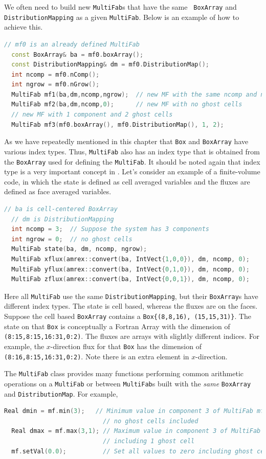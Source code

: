 {{We often need to build new {\tt MultiFab}s that have the same {\tt
  BoxArray} and {\tt DistributionMapping} as a given {\tt MultiFab}.
Below is an example of how to achieve this.
\begin{lstlisting}[language=cpp]
  // mf0 is an already defined MultiFab
  const BoxArray& ba = mf0.boxArray();
  const DistributionMapping& dm = mf0.DistributionMap();
  int ncomp = mf0.nComp();
  int ngrow = mf0.nGrow();
  MultiFab mf1(ba,dm,ncomp,ngrow);  // new MF with the same ncomp and ngrow
  MultiFab mf2(ba,dm,ncomp,0);      // new MF with no ghost cells
  // new MF with 1 component and 2 ghost cells
  MultiFab mf3(mf0.boxArray(), mf0.DistributionMap(), 1, 2);               
\end{lstlisting}

As we have repeatedly mentioned in this chapter that {\tt Box} and
{\tt BoxArray} have various index types.  Thus, {\tt MultiFab} also
has an index type that is obtained from the {\tt BoxArray} used for
defining the {\tt MultiFab}.  It should be noted again that index type
is a very important concept in \amrex.  Let's consider an example of a
finite-volume code, in which the state is defined as cell averaged
variables and the fluxes are defined as face averaged variables.
\begin{lstlisting}[language=cpp]
  // ba is cell-centered BoxArray
  // dm is DistributionMapping
  int ncomp = 3;  // Suppose the system has 3 components
  int ngrow = 0;  // no ghost cells
  MultiFab state(ba, dm, ncomp, ngrow);
  MultiFab xflux(amrex::convert(ba, IntVect{1,0,0}), dm, ncomp, 0);
  MultiFab yflux(amrex::convert(ba, IntVect{0,1,0}), dm, ncomp, 0);
  MultiFab zflux(amrex::convert(ba, IntVect{0,0,1}), dm, ncomp, 0);
\end{lstlisting}
Here all {\tt MultiFab} use the same {\tt DistributionMapping}, but
their {\tt BoxArray}s have different index types.  The state is cell
based, whereas the fluxes are on the faces.  Suppose the cell based
{\tt BoxArray} contains a {\tt Box\{(8,8,16), (15,15,31)\}}.  The
state on that {\tt Box} is conceptually a Fortran Array with the
dimension of {\tt (8:15,8:15,16:31,0:2)}.  The fluxes are arrays with
slightly different indices.  For example, the $x$-direction flux for
that {\tt Box} has the dimension of {\tt (8:16,8:15,16:31,0:2)}.  Note
there is an extra element in $x$-direction.

The {\tt MultiFab} class provides many functions performing common
arithmetic operations on a {\tt MultiFab} or between {\tt MultiFab}s
built with the {\emph{same}} {\tt BoxArray} and {\tt DistributionMap}.
For example,
\begin{lstlisting}[language=cpp]
  Real dmin = mf.min(3);   // Minimum value in component 3 of MultiFab mf
                           // no ghost cells included
  Real dmax = mf.max(3,1); // Maximum value in component 3 of MultiFab mf
                           // including 1 ghost cell
  mf.setVal(0.0);          // Set all values to zero including ghost cells


\end{lstlisting}}}
